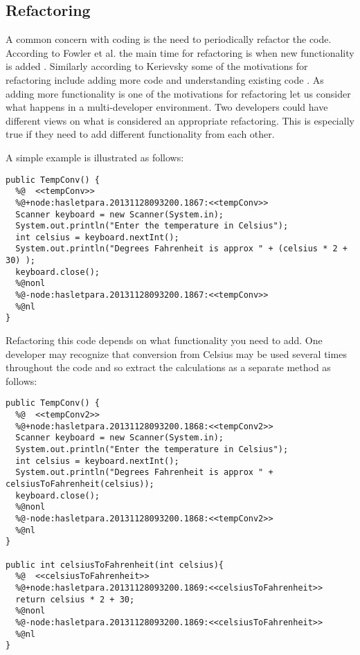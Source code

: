 \documentclass[12pt]{CRPITStyle}
\renewcommand{\cite}{\citep}
\begin{document}
\subsection{Refactoring}
A common concern with coding is the need to periodically refactor the code. According to Fowler et al. the main time for refactoring is when new functionality is added \cite{Fowler1999}. Similarly according to Kerievsky some of the motivations for refactoring include adding more code and understanding existing code \cite{Kerievsky2004}. As adding more functionality is one of the motivations for refactoring let us consider what happens in a multi-developer environment. Two developers could have different views on what is considered an appropriate refactoring. This is especially true if they need to add different functionality from each other. 

A simple example is illustrated as follows:
\begin{verbatim}
public TempConv() {
  %@  <<tempConv>>
  %@+node:hasletpara.20131128093200.1867:<<tempConv>>
  Scanner keyboard = new Scanner(System.in);
  System.out.println("Enter the temperature in Celsius");
  int celsius = keyboard.nextInt();
  System.out.println("Degrees Fahrenheit is approx " + (celsius * 2 + 30) );
  keyboard.close();
  %@nonl
  %@-node:hasletpara.20131128093200.1867:<<tempConv>>
  %@nl
}
\end{verbatim}

Refactoring this code depends on what functionality you need to add. One developer may recognize that conversion from Celsius may be used several times throughout the code and so extract the calculations as a separate method as follows:

\begin{verbatim}
public TempConv() {
  %@  <<tempConv2>>
  %@+node:hasletpara.20131128093200.1868:<<tempConv2>>
  Scanner keyboard = new Scanner(System.in);
  System.out.println("Enter the temperature in Celsius");
  int celsius = keyboard.nextInt();
  System.out.println("Degrees Fahrenheit is approx " + celsiusToFahrenheit(celsius));
  keyboard.close();
  %@nonl
  %@-node:hasletpara.20131128093200.1868:<<tempConv2>>
  %@nl
}

public int celsiusToFahrenheit(int celsius){
  %@  <<celsiusToFahrenheit>>
  %@+node:hasletpara.20131128093200.1869:<<celsiusToFahrenheit>>
  return celsius * 2 + 30;
  %@nonl
  %@-node:hasletpara.20131128093200.1869:<<celsiusToFahrenheit>>
  %@nl
}
\end{verbatim}
\end{document}
